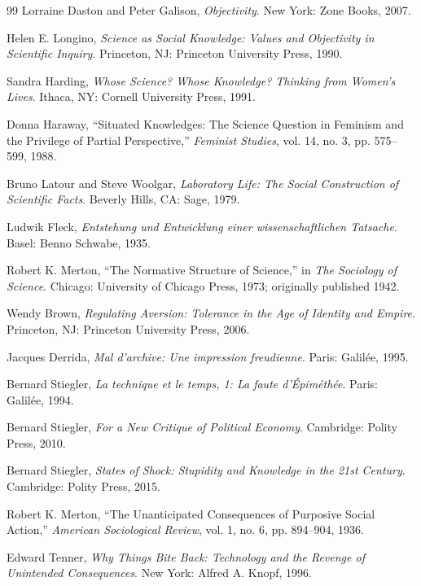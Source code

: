 \documentclass[11pt,oneside]{book}
\theoremstyle{definition}
\theoremstyle{remark}
\begin{document}
\begin{thebibliography}{99}
 Lorraine Daston and Peter Galison, \emph{Objectivity}. New York: Zone Books, 2007.

 Helen E. Longino, \emph{Science as Social Knowledge: Values and Objectivity in Scientific
  Inquiry}. Princeton, NJ: Princeton University Press, 1990.

 Sandra Harding, \emph{Whose Science? Whose Knowledge? Thinking from Women's Lives}. Ithaca, NY:
  Cornell University Press, 1991.

 Donna Haraway, ``Situated Knowledges: The Science Question in Feminism and the Privilege of
  Partial Perspective,'' \emph{Feminist Studies}, vol. 14, no. 3, pp. 575--599, 1988.

 Bruno Latour and Steve Woolgar, \emph{Laboratory Life: The Social Construction of Scientific
  Facts}. Beverly Hills, CA: Sage, 1979.

 Ludwik Fleck, \emph{Entstehung und Entwicklung einer wissenschaftlichen Tatsache}. Basel: Benno
  Schwabe, 1935.

 Robert K. Merton, ``The Normative Structure of Science,'' in \emph{The Sociology of Science}.
  Chicago: University of Chicago Press, 1973; originally published 1942.

 Wendy Brown, \emph{Regulating Aversion: Tolerance in the Age of Identity and Empire}. Princeton,
  NJ: Princeton University Press, 2006.

 Jacques Derrida, \emph{Mal d'archive: Une impression freudienne}. Paris: Galil\'ee, 1995.

 Bernard Stiegler, \emph{La technique et le temps, 1: La faute d'\'Epim\'eth\'ee}. Paris:
  Galil\'ee, 1994.

 Bernard Stiegler, \emph{For a New Critique of Political Economy}. Cambridge: Polity Press, 2010.

 Bernard Stiegler, \emph{States of Shock: Stupidity and Knowledge in the 21st Century}.
  Cambridge: Polity Press, 2015.

 Robert K. Merton, ``The Unanticipated Consequences of Purposive Social Action,'' \emph{American
  Sociological Review}, vol. 1, no. 6, pp. 894--904, 1936.

 Edward Tenner, \emph{Why Things Bite Back: Technology and the Revenge of Unintended
  Consequences}. New York: Alfred A. Knopf, 1996.


\end{thebibliography}
\end{document}
